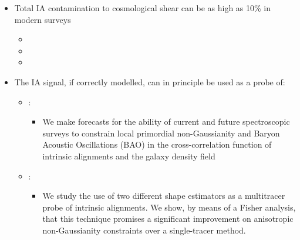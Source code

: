 \documentclass[letterpaper,10pt,english]{sphinxmanual}
\begin{document}
\begin{itemize}
\item {} 
Total IA contamination to cosmological shear can be as high as 10\% in
modern surveys
\begin{itemize}
\item {} 

\item {} 

\item {} 

\end{itemize}

\item {} 
The IA signal, if correctly modelled, can in principle be used as a
probe of:
\begin{itemize}
\item {} 
: 
\begin{itemize}
\item {} 
We make forecasts for the ability of current and future
spectroscopic surveys to constrain local primordial
non-Gaussianity and Baryon Acoustic Oscillations (BAO) in the
cross-correlation function of intrinsic alignments and the
galaxy density field

\end{itemize}

\item {} 
: 
\begin{itemize}
\item {} 
We study the use of two different shape estimators as a
multitracer probe of intrinsic alignments. We show, by means of
a Fisher analysis, that this technique promises a significant
improvement on anisotropic non-Gaussianity constraints over a
single-tracer method.


\end{itemize}
\end{itemize}
\end{itemize}
\end{document}
